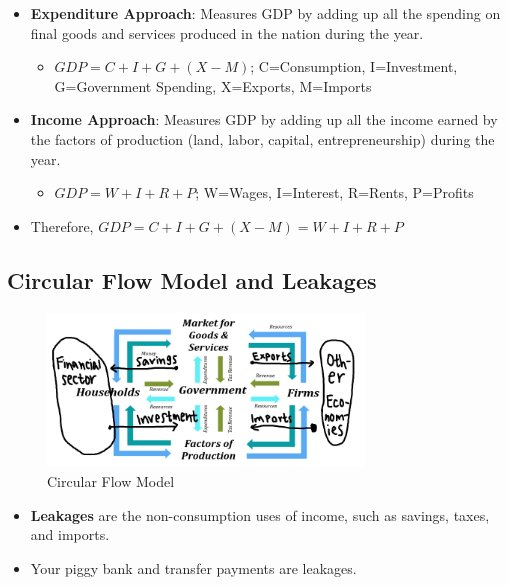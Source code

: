 \documentclass[
  letterpaper,
  DIV=11,
  numbers=noendperiod]{scrartcl}
\providecommand{\tightlist}{%
  \setlength{\itemsep}{0pt}\setlength{\parskip}{0pt}}\usepackage{longtable,booktabs,array}
\begin{document}
\begin{itemize}
\tightlist
\item
  \textbf{Expenditure Approach}: Measures GDP by adding up all the
  spending on final goods and services produced in the nation during the
  year.

  \begin{itemize}
  \tightlist
  \item
    \(GDP = C + I + G + (X-M)\); C=Consumption, I=Investment,
    G=Government Spending, X=Exports, M=Imports
  \end{itemize}
\item
  \textbf{Income Approach}: Measures GDP by adding up all the income
  earned by the factors of production (land, labor, capital,
  entrepreneurship) during the year.

  \begin{itemize}
  \tightlist
  \item
    \(GDP = W + I + R + P\); W=Wages, I=Interest, R=Rents, P=Profits
  \end{itemize}
\item
  Therefore, \(GDP = C + I + G + (X-M) = W + I + R + P\)
\end{itemize}

\newpage{}

\subsection{Circular Flow Model and
Leakages}\label{circular-flow-model-and-leakages}

\begin{figure}[H]

{\centering \includegraphics[width=0.75\textwidth,height=\textheight]{img/circular-flow.png}

}

\caption{Circular Flow Model}

\end{figure}%

\begin{itemize}
\tightlist
\item
  \textbf{Leakages} are the non-consumption uses of income, such as
  savings, taxes, and imports.
\item
  Your piggy bank and transfer payments are leakages.
\end{itemize}
\end{document}

